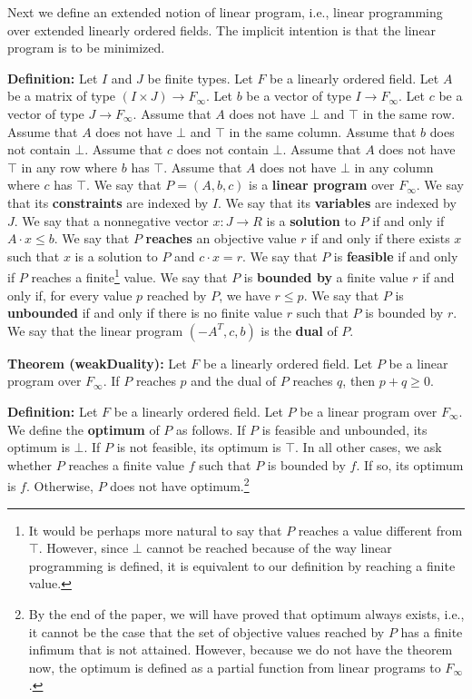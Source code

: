 \documentclass[]{article}
\renewcommand{\.}{\hskip .75pt}
\let\r=\rightarrow
\let\*=\cdot
\begin{document}
Next we define an extended notion of linear program, i.e.,
linear programming over extended linearly ordered fields.
The implicit intention is that the linear program is to be minimized.

\medskip \noindent
\textbf{Definition:}
Let $I$ and $J$ be finite types.
Let $F$ be a linearly ordered field.
Let $A$ be a matrix of type $(I \times J) \r F_\infty$.
Let $b$ be a vector of type $I \r F_\infty$.
Let $c$ be a vector of type $J \r F_\infty$.
Assume that $A$ does not have $\bot$ and $\top$ in the same row.
Assume that $A$ does not have $\bot$ and $\top$ in the same column.
Assume that $b$ does not contain $\bot$.
Assume that $c$ does not contain $\bot$.
Assume that $A$ does not have $\top$ in any row where $b$ has $\top$.
Assume that $A$ does not have $\bot$ in any column where $c$ has $\top$.
We say that $P = (A, b, c)$ is a \textbf{linear program} over $F_\infty$.
We say that its \textbf{constraints} are indexed by $I$.
We say that its \textbf{variables} are indexed by $J$.
We say that a nonnegative vector $x : J \r R$ is
a \textbf{solution} to $P$ if and only if $A \* x \le b$.
We say that $P$ \textbf{reaches} an objective value $r$
if and only if there exists $x$ such that $x$ is a solution to $P$
and $c \* x = r$.
We say that $P$ is \textbf{feasible} if and only if $P$ reaches a finite\footnote{
It would be perhaps more natural to say that $P$ reaches a value different
from $\top$. However, since $\bot$ cannot be reached because of the way
linear programming is defined, it is equivalent to our definition by
reaching a finite value.} value.
We say that $P$ is \textbf{bounded by} a finite value $r$ if and only if,
for every value $p$ reached by $P$, we have $r \le p$.
We say that $P$ is \textbf{unbounded} if and only if there is no finite value $r$
such that $P$ is bounded by $r$.
We say that the linear program $(-A^T, c, b)$ is the \textbf{dual} of $P$.

\medskip \noindent
\textbf{Theorem (weakDuality):}
Let $F$ be a linearly ordered field.
Let $P$ be a linear program over $F_\infty$.
If $P$ reaches $p$ and the dual of $P$ reaches $q$,
then $p + q \ge 0$.

\medskip \noindent
\textbf{Definition:}
Let $F$ be a linearly ordered field.
Let $P$ be a linear program over $F_\infty$.
We define the \textbf{optimum} of $P$ as follows.
If $P$ is feasible and unbounded, its optimum is $\bot$.
If $P$ is not feasible, its optimum is $\top$.
In all other cases, we ask whether $P$ reaches a finite value $f$ such that
$P$ is bounded by $f$. If so, its optimum is $f$.
Otherwise, $P$ does not have optimum.\footnote{By the end of the paper, we will
have proved that optimum always exists, i.e., it cannot be the case that the set of
objective values reached by $P$ has a finite infimum that is not attained.
However, because we do not have the theorem now, the optimum is defined as a partial function
from linear programs to $F_\infty$.}
\end{document}
